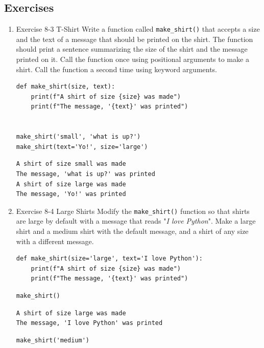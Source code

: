 \documentclass[10pt]{book}
\begin{document}
\subsection{Exercises}
\label{sec:orgfc1b0f3}
\begin{enumerate}
\item Exercise 8-3 T-Shirt
\label{sec:org3522e51}
Write a function called \texttt{make\_shirt()} that accepts a size and the text of a message that should be printed on the shirt. The function should print a sentence summarizing the size of the shirt and the message printed on it. Call the function once using positional arguments to make a shirt. Call the function a second time using keyword arguments.
\begin{verbatim}
def make_shirt(size, text):
    print(f"A shirt of size {size} was made")
    print(f"The message, '{text}' was printed")


make_shirt('small', 'what is up?')
make_shirt(text='Yo!', size='large')
\end{verbatim}

\label{orgcf9eb03}
\begin{verbatim}
A shirt of size small was made
The message, 'what is up?' was printed
A shirt of size large was made
The message, 'Yo!' was printed
\end{verbatim}
\item Exercise 8-4 Large Shirts
\label{sec:orge4989cd}
Modify the \texttt{make\_shirt()} function so that shirts are large by default with a message that reads "\emph{I love Python}". Make a large shirt and a medium shirt with the default message, and a shirt of any size with a different message.
\begin{verbatim}
def make_shirt(size='large', text='I love Python'):
    print(f"A shirt of size {size} was made")
    print(f"The message, '{text}' was printed")
\end{verbatim}

\begin{verbatim}
make_shirt()
\end{verbatim}

\label{org723d839}
\begin{verbatim}
A shirt of size large was made
The message, 'I love Python' was printed
\end{verbatim}

\begin{verbatim}
make_shirt('medium')
\end{verbatim}


\end{enumerate}
\end{document}
